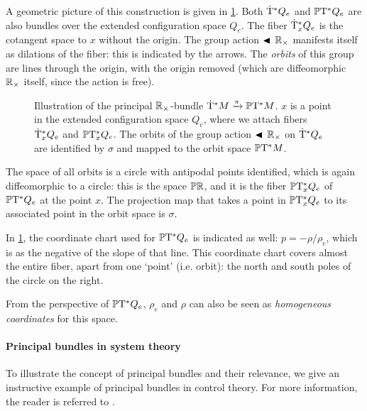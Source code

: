 A geometric picture of this construction is given in \cref{fig:principal_bundle}. Both \(\mathrm{\dot{T}}^*Q_e\) and \(\mathbb{P}\mathrm{T}^* Q_e\) are also bundles over the extended configuration space \(Q_e\). 
The fiber \(\mathrm{\dot{T}}^*_{x} Q_e\) is the cotangent space to \(x\) without the origin. 
The group action \(\blacktriangleleft\,\mathbb{R}_{\times}\) manifests itself as dilations of the fiber: this is indicated by the arrows. The \emph{orbits} of this group are lines through the origin, with the origin removed (which are diffeomorphic \(\mathbb{R}_{\times}\) itself, since the action is free). 
\begin{figure}[ht!]
    \centering
    
    \caption{Illustration of the principal \(\mathbb{R}_{\times}\)-bundle \(\mathrm{\dot{T}}^*M\xrightarrow[]{\pi}\mathbb{P}\mathrm{T}^* M\). \(x\) is a point in the extended configuration space \(Q_e\), where we attach fibers \(\mathrm{\dot{T}}^*_{x} Q_e\) and \(\mathbb{P}\mathrm{T}^*_{x} Q_e\). The orbits of the group action \(\blacktriangleleft\,\mathbb{R}_{\times}\) on \(\mathrm{\dot{T}}^*Q_e\) are identified by \(\sigma\) and mapped to the orbit space \(\mathbb{P}\mathrm{T}^* M\). }
    \label{fig:principal_bundle}
\end{figure}

The space of all orbits is a circle with antipodal points identified, which is again diffeomorphic to a circle: this is the space \(\mathbb{P}\mathbb{R}\), and it is the fiber \(\mathbb{P}\mathrm{T}^*_{x} Q_e\) of \(\mathbb{P}\mathrm{T}^* Q_e\) at the point \(x\). The projection map that takes a point in \(\mathbb{P}\mathrm{T}^*_{x} Q_e\) to its associated point in the orbit space is \(\sigma\). 

In \cref{fig:principal_bundle}, the coordinate chart used for \(\mathbb{P}\mathrm{T}^* Q_e\) is indicated as well: \(p = -\rho/\rho_e\), which is as the negative of the slope of that line. This coordinate chart covers almost the entire fiber, apart from one `point' (i.e. orbit): the north and south poles of the circle on the right.

From the perspective of \(\mathbb{P}\mathrm{T}^* Q_e\), \(\rho_e\) and \(\rho\) can also be seen as \emph{homogeneous coordinates} for this space.

\paragraph{Principal bundles in system theory}
To illustrate the concept of principal bundles and their relevance, we give an instructive example of principal bundles in control theory. For more information, the reader is referred to \citet{Hermann1984}. 

